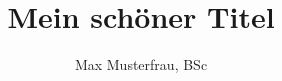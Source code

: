 
\title{Mein schöner Titel}
\newcommand{\name}{Max Musterfrau}
\author{\name, BSc}
\newcommand{\betreuer}{Prof. Dr. Peter Reichl}
\newcommand{\gutachterA}{Zeile kann bei Bedarf auskommentiert werden}
\newcommand{\gutachterB}{Zeile kann bei Bedarf auskommentiert werden}

\newcommand{\dissertationsgebiet}{Informatik}
\newcommand{\studienkennzahl}{A-1234567}
\newcommand{\akademischergrad}{Master of the Universe}
